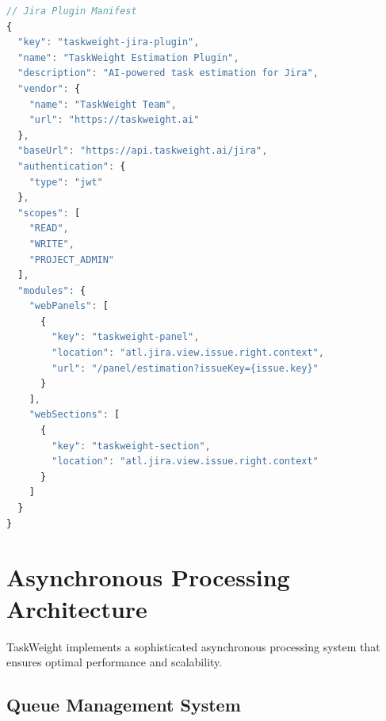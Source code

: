 \documentclass[12pt,a4paper]{article}
\begin{document}
\begin{lstlisting}[language=JavaScript, caption=Jira Plugin Configuration]
// Jira Plugin Manifest
{
  "key": "taskweight-jira-plugin",
  "name": "TaskWeight Estimation Plugin",
  "description": "AI-powered task estimation for Jira",
  "vendor": {
    "name": "TaskWeight Team",
    "url": "https://taskweight.ai"
  },
  "baseUrl": "https://api.taskweight.ai/jira",
  "authentication": {
    "type": "jwt"
  },
  "scopes": [
    "READ",
    "WRITE",
    "PROJECT_ADMIN"
  ],
  "modules": {
    "webPanels": [
      {
        "key": "taskweight-panel",
        "location": "atl.jira.view.issue.right.context",
        "url": "/panel/estimation?issueKey={issue.key}"
      }
    ],
    "webSections": [
      {
        "key": "taskweight-section",
        "location": "atl.jira.view.issue.right.context"
      }
    ]
  }
}
\end{lstlisting}

\section{Asynchronous Processing Architecture}

TaskWeight implements a sophisticated asynchronous processing system that ensures optimal performance and scalability.

\subsection{Queue Management System}
\end{document}
